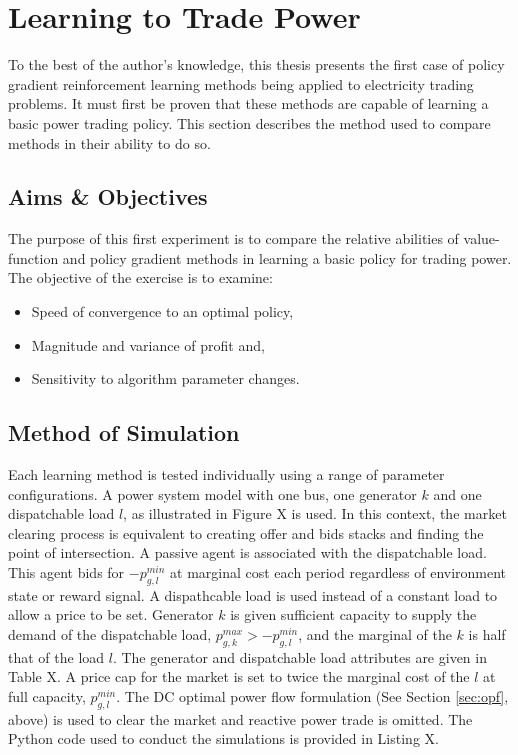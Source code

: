 \chapter{Learning to Trade Power}
\label{ch:learningtotrade}
To the best of the author's knowledge, this thesis presents the first case of
policy gradient reinforcement learning methods being applied to electricity
trading problems.  It must first be proven that these methods are capable of
learning a basic power trading policy.  This section describes the method used
to compare methods in their ability to do so.

\section{Aims \& Objectives} The purpose of this first experiment is to
compare the relative abilities of value-function and policy gradient methods in
learning a basic policy for trading power.  The objective of the exercise is to
examine:
\begin{itemize}
  \item Speed of convergence to an optimal policy,
  \item Magnitude and variance of profit and,
  \item Sensitivity to algorithm parameter changes.
\end{itemize}

\section{Method of Simulation}
Each learning method is tested individually using a range of parameter
configurations.  A power system model with one bus, one generator $k$ and
one dispatchable load $l$, as illustrated in Figure X is used.  In this
context, the market clearing process is equivalent to creating offer and bids
stacks and finding the point of intersection.  A passive agent is associated
with the dispatchable load.  This agent bids for $-p_{g,l}^{min}$ at marginal
cost each period regardless of environment state or reward signal.  A
dispathcable load is used instead of a constant load to allow a price to be
set. Generator $k$ is given sufficient capacity to supply the demand
of the dispatchable load, $p_{g,k}^{max} > -p_{g,l}^{min}$, and the marginal of
the $k$ is half that of the load $l$.  The generator and dispatchable load
attributes are given in Table X.  A price cap for the market is set to twice the
marginal cost of the $l$ at full capacity, $p_{g,l}^{min}$.  The DC optimal
power flow formulation (See Section \ref{sec:opf}, above) is used to clear the
market and reactive power trade is omitted.  The Python code used to conduct the
simulations is provided in Listing X.

